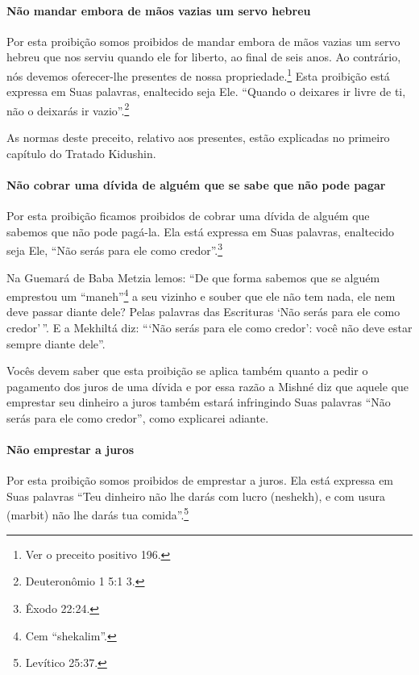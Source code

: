 \paragraph{Não mandar embora de mãos vazias um servo hebreu}

Por esta proibição somos proibidos de mandar embora de mãos vazias um
servo hebreu que nos serviu quando ele for liberto, ao final de seis
anos. Ao contrário, nós devemos oferecer-lhe presentes de nossa
propriedade.\footnote{Ver o preceito positivo 196.} Esta proibição está expressa em Suas
palavras, enaltecido seja Ele. ``Quando o deixares ir livre de ti, não
o deixarás ir vazio''.\footnote{Deuteronômio 1 5:1 3.}

As normas deste preceito, relativo aos presentes, estão explicadas no
primeiro capítulo do Tratado Kidushin.

\paragraph{Não cobrar uma dívida de alguém que se sabe que não pode pagar}

Por esta proibição ficamos proibidos de cobrar uma dívida de alguém que
sabemos que não pode pagá-la. Ela está expressa em Suas palavras,
enaltecido seja Ele, ``Não serás para ele como credor''.\footnote{Êxodo 22:24.}

Na Guemará de Baba Metzia lemos: ``De que forma sabemos que se alguém
emprestou um ``maneh''\footnote{Cem ``shekalim''.} a seu vizinho e souber que
ele não tem nada, ele nem deve passar diante dele? Pelas palavras das
Escrituras `Não serás para ele como credor'\,''. E a Mekhiltá diz: ```Não
serás para ele como credor': você não deve estar sempre diante dele''.

Vocês devem saber que esta proibição se aplica também quanto a pedir o
pagamento dos juros de uma dívida e por essa razão a Mishné diz que
aquele que emprestar seu dinheiro a juros também estará infringindo Suas
palavras ``Não serás para ele como credor'', como explicarei adiante.

\paragraph{Não emprestar a juros}

Por esta proibição somos proibidos de emprestar a juros. Ela está
expressa em Suas palavras ``Teu dinheiro não lhe darás com lucro
(neshekh), e com usura (marbit) não lhe darás tua comida''.\footnote{Levítico
25:37.}

